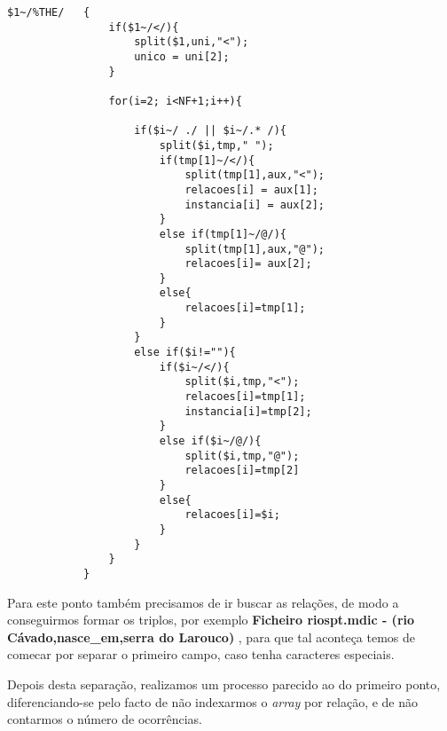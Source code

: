\documentclass{report}
\begin{document}
\begin{verbatim}
$1~/%THE/   { 
                if($1~/</){
                    split($1,uni,"<");
                    unico = uni[2];
                }

                for(i=2; i<NF+1;i++){
                    
                    if($i~/ ./ || $i~/.* /){
                        split($i,tmp," ");
                        if(tmp[1]~/</){
                            split(tmp[1],aux,"<");
                            relacoes[i] = aux[1];
                            instancia[i] = aux[2];
                        } 
                        else if(tmp[1]~/@/){
                            split(tmp[1],aux,"@");
                            relacoes[i]= aux[2];
                        }
                        else{
                            relacoes[i]=tmp[1];
                        }
                    }
                    else if($i!=""){
                        if($i~/</){
                            split($i,tmp,"<");
                            relacoes[i]=tmp[1];
                            instancia[i]=tmp[2];
                        }
                        else if($i~/@/){
                            split($i,tmp,"@");
                            relacoes[i]=tmp[2]
                        }
                        else{ 
                            relacoes[i]=$i;
                        }
                    }
                }
            }
\end{verbatim}

    Para este ponto também precisamos de ir buscar as relações, de modo a conseguirmos formar os triplos, por exemplo \textbf{Ficheiro riospt.mdic - (rio Cávado,nasce\_em,serra do Larouco) }, para que tal aconteça temos de comecar por separar o primeiro campo, caso tenha caracteres especiais. 

    Depois desta separação, realizamos um processo parecido ao do primeiro ponto, diferenciando-se pelo facto de não indexarmos o \textit{array} por relação, e de não contarmos o número de ocorrências.    
\end{document}
